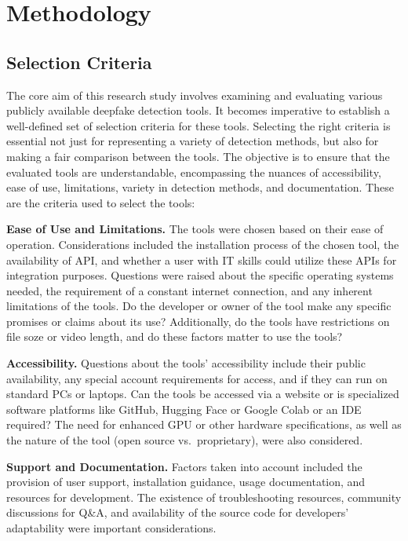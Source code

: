 
\chapter{Methodology}\label{chapter:methodology}

\section{Selection Criteria}
The core aim of this research study involves examining and evaluating
various publicly available deepfake detection tools. It becomes imperative
to establish a well-defined set of selection criteria for these tools.
Selecting the right criteria is essential not just for representing a variety
of detection methods, but also for making a fair comparison between the tools.
The objective is to ensure that the evaluated tools are understandable,
encompassing the nuances of accessibility, ease of use, limitations, variety
in detection methods, and documentation. These are the criteria used to select the tools:

\textbf{Ease of Use and Limitations.} The tools were chosen based on their ease of
operation. Considerations included the installation process of the chosen tool,
the availability of \ac{API}, and whether a user with IT skills could utilize
these APIs for integration purposes. Questions were raised about the specific
operating systems needed, the requirement of a constant internet connection,
and any inherent limitations of the tools. Do the developer or owner of the
tool make any specific promises or claims about its use? Additionally, do the
tools have restrictions on file soze or video length, and do these factors
matter to use the tools?

\textbf{Accessibility.} Questions about the tools' accessibility include their
public availability, any special account requirements for access, and if they can
run on standard PCs or laptops. Can the tools be accessed via a website or is specialized
software platforms like GitHub, Hugging Face or Google Colab or an \ac{IDE} required?
The need for enhanced \ac{GPU} or other hardware specifications, as well as the nature
of the tool (open source vs.\ proprietary), were also considered.

\textbf{Support and Documentation.} Factors taken into account included the
provision of user support, installation guidance, usage documentation, and
resources for development. The existence of troubleshooting resources,
community discussions for Q\&A, and availability of the source code for
developers' adaptability were important considerations.

